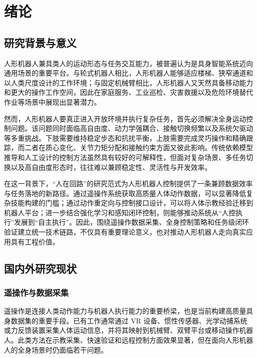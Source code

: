 
\chapter{绪论}

\section{研究背景与意义}

人形机器人兼具类人的运动形态与任务交互能力，被普遍认为是具身智能系统迈向通用场景的重要平台。与轮式机器人相比，人形机器人能够适应楼梯、狭窄通道和以人类尺度设计的工作环境；与固定机械臂相比，人形机器人又天然具备移动能力和更大的操作工作空间，因此在家庭服务、工业巡检、灾害救援以及危险环境替代作业等场景中展现出显著潜力。

然而，人形机器人要真正进入开放环境并执行复杂任务，首先必须解决全身运动控制问题。该问题同时面临高自由度、动力学强耦合、接触切换频繁以及系统欠驱动等多重挑战。下肢需要维持稳定步态和抗扰平衡，上肢需要完成灵巧操作和精确跟踪，而二者在质心变化、关节力矩分配和接触约束方面又彼此影响。传统依赖模型推导和人工设计的控制方法虽然具有较好的可解释性，但面对复杂场景、多任务切换以及高自由度形态时，往往难以兼顾稳定性、灵活性与开发效率。

在这一背景下，“人在回路”的研究范式为人形机器人控制提供了一条兼顾数据效率与任务落地的新路径。通过遥操作系统获取高质量人体动作数据，可以显著降低复杂技能构建的门槛；通过动作重定向与控制接口设计，可以将人体示教经验迁移到机器人平台；进一步结合强化学习和感知闭环控制，则能够推动系统从“人控执行”发展到“自主执行”。因此，围绕遥操作数据采集、全身控制策略和任务级闭环验证建立统一技术链路，不仅具有重要理论意义，也对推动人形机器人走向真实应用具有工程价值。

\section{国内外研究现状}

\subsection{遥操作与数据采集}

遥操作是连接人类动作能力与机器人执行能力的重要桥梁，也是当前构建高质量具身数据集的重要手段。已有工作通常通过 VR 设备、惯性传感器、光学动捕系统或力反馈装置采集人体运动信息，并将其映射到机械臂、双臂平台或移动操作机器人。此类方法在示教采集、快速验证和远程控制方面效果显著，但在面向人形机器人的全身场景时仍面临若干问题。

